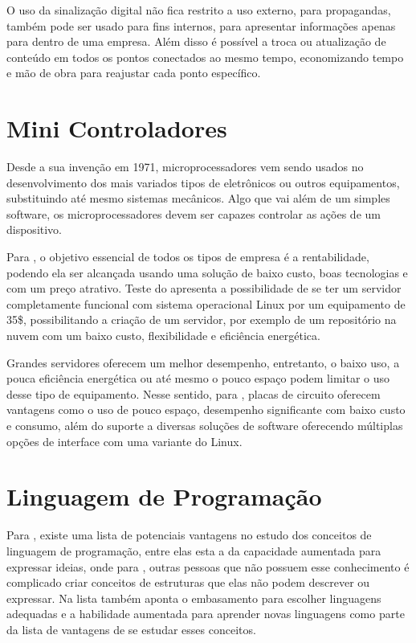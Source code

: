O uso da sinalização digital não fica restrito a uso externo, para propagandas, também pode ser usado para fins internos, para apresentar informações apenas para dentro de uma empresa. Além disso é possível a troca ou atualização de conteúdo em todos os
pontos conectados ao mesmo tempo, economizando tempo e mão de obra para reajustar
cada ponto específico.


\section{Mini Controladores}
Desde a sua invenção em 1971, microprocessadores vem sendo usados no desenvolvimento dos mais variados tipos de eletrônicos ou outros equipamentos, substituindo até mesmo sistemas mecânicos. Algo que vai além de um simples software, os microprocessadores devem ser capazes controlar as ações de um dispositivo. \cite{rosenstark2007}

Para \cite{aristotelous2016}, o objetivo essencial de todos os tipos de empresa é a rentabilidade, podendo ela ser alcançada usando uma solução de baixo custo, boas tecnologias e com um preço atrativo. Teste do \cite{aristotelous2016} apresenta a possibilidade de se ter um servidor completamente funcional com sistema operacional Linux por um equipamento de 35\$, possibilitando a criação de um servidor, por exemplo de um repositório na nuvem com um baixo custo, flexibilidade e eficiência energética. 

Grandes servidores oferecem um melhor desempenho, entretanto, o baixo uso, a pouca eficiência energética ou até mesmo o pouco espaço podem limitar o uso desse tipo de equipamento. Nesse sentido, para \cite{Cusick}, placas de circuito oferecem vantagens como o uso de pouco espaço, desempenho significante com baixo custo e consumo, além do suporte a diversas soluções de software oferecendo múltiplas opções de interface com uma variante do Linux. 

\section{Linguagem de Programação}
Para \cite{sebesta2011}, existe uma lista de potenciais vantagens no estudo dos conceitos de linguagem de programação, entre elas esta a da capacidade aumentada para expressar ideias, onde para \cite{sebesta2011}, outras pessoas que não possuem esse conhecimento é complicado criar conceitos de estruturas que elas não podem descrever ou expressar. Na lista também aponta o embasamento para escolher linguagens adequadas e a habilidade aumentada para aprender novas linguagens como parte da lista de vantagens de se estudar esses conceitos.

